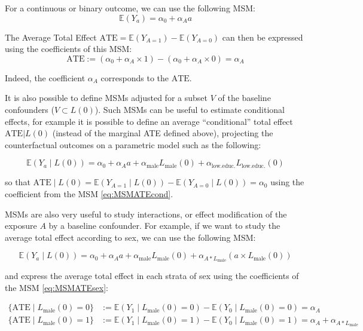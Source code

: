 \documentclass[
]{book}
\begin{document}
For a continuous or binary outcome, we can use the following MSM:
\begin{equation} 
  \mathbb{E}(Y_a) = \alpha_0 + \alpha_A a 
  \label{eq:MSMATEmarg}
\end{equation}

The Average Total Effect \(\text{ATE} = \mathbb{E}(Y_{A=1}) - \mathbb{E}(Y_{A=0})\) can then be expressed using the coefficients of this MSM:
\begin{equation} 
  \text{ATE} := \left(\alpha_0 + \alpha_A \times 1 \right) - \left(\alpha_0 + \alpha_A \times 0 \right) = \alpha_A 
  \label{eq:ATEcoefFromMSM}
\end{equation}

Indeed, the coefficient \(\alpha_A\) corresponds to the \(\text{ATE}\).

It is also possible to define MSMs adjusted for a subset \(V\) of the baseline confounders (\(V \subset L(0)\)). Such MSMs can be useful to estimate conditional effects, for example it is possible to define an average ``conditional'' total effect \(\text{ATE}|L(0)\) (instead of the marginal ATE defined above), projecting the counterfactual outcomes on a parametric model such as the following:

\begin{equation} 
  \mathbb{E}(Y_a \mid L(0)) = \alpha_0 + \alpha_A a + \alpha_\text{male} L_\text{male}(0) + \alpha_\text{low.educ.} L_\text{low.educ.}(0)
  \label{eq:MSMATEcond}
\end{equation}

so that \(\text{ATE} \mid L(0) = \mathbb{E}(Y_{A=1} \mid L(0)) - \mathbb{E}(Y_{A=0} \mid L(0)) = \alpha_0\) using the coefficient from the MSM \eqref{eq:MSMATEcond}.

MSMs are also very useful to study interactions, or effect modification of the exposure \(A\) by a baseline confounder. For example, if we want to study the average total effect according to sex, we can use the following MSM:

\begin{equation} 
  \mathbb{E}(Y_a \mid L(0)) = \alpha_0 + \alpha_A a + \alpha_\text{male} L_\text{male}(0) + \alpha_{A \ast L_\text{male}} \left(a \times L_\text{male}(0)\right)
  \label{eq:MSMATEsex}
\end{equation}

and express the average total effect in each strata of sex using the coefficients of the MSM \eqref{eq:MSMATEsex}:

\begin{align*}
 \{\text{ATE} \mid L_\text{male}(0) = 0\} &:= \mathbb{E}(Y_1 \mid L_\text{male}(0) = 0) - \mathbb{E}(Y_0 \mid L_\text{male}(0) = 0) = \alpha_A \\
 \{\text{ATE} \mid L_\text{male}(0) = 1\} &:= \mathbb{E}(Y_1 \mid L_\text{male}(0) = 1) - \mathbb{E}(Y_0 \mid L_\text{male}(0) = 1) = \alpha_A + \alpha_{A \ast L_\text{male}}
\end{align*}
\end{document}
